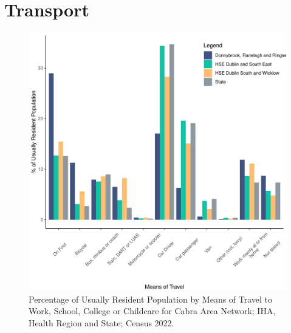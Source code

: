\documentclass{article}
\begin{document}
\section{Transport}\label{sect:Trans}
\begin{figure}[H]
	\centering
	\includegraphics[width = 120mm]{../figures/TravelED.pdf}
	\caption{Percentage of Usually Resident Population by Means of Travel to Work, School, College or Childcare for Cabra Area Network; IHA, Health Region and State; Census 2022.}
	\label{fig:vbnv}
	\end{figure}
\end{document}
